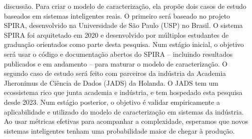 {discussão. Para criar o modelo de caracterização, ela propõe dois casos de
estudo baseados em sistemas inteligentes reais. O primeiro será baseado no
projeto SPIRA, desenvolvido na Universidade de São Paulo (USP) no Brasil. O
sistema SPIRA foi arquitetado em 2020 e desenvolvido por múltiplos estudantes de
graduação orientados como parte desta pesquisa. Num estágio inicial, o objetivo
será usar o código e documentação abertos do SPIRA -- incluindo resultados
publicados e em andamento -- para maturar o modelo de caracterização. O segundo
caso de estudo será feito com parceiros da indústria da Academia Jheronimus de
Ciência de Dados (JADS) da Holanda. O JADS tem um ecossistema rico que junta
academia e indústria, e tem hospedado esta pesquisa desde 2023. Num estágio
posterior, o objetivo é validar empiricamente a aplicabilidade e utilizado do
modelo de caracterização em sistemas da indústria. Ao usar métricas efetivas
para acompanhar a complexidade, esperamos que novos sistemas inteligentes tenham
uma probabilidade maior de chegar à produção.
}

